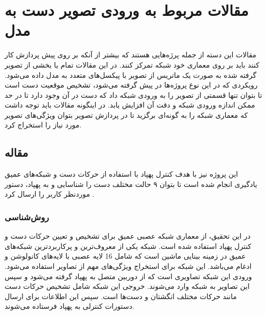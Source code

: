 



\section{مقالات مربوط به ورودی تصویر دست به مدل}
مقالات این دسته از جمله پرژه‌هایی هستند که بیشتر از آنکه بر روی پیش پردازش کار کنند باید بر روی معماری خود شبکه تمرکز کنند. در این مقالات تمام یا بخشی از تصویر گرفته شده به صورت یک ماتریس از تصویر با پیکسل‌های متعدد به مدل داده می‌شود. رویکردی که در این نوع پروژه‌ها در پیش گرفته می‌شود، تشخیص موقعیت دست است تا بتوان تنها قسمتی از تصویر را به ورودی شبکه داد که دست در آن وجود دارد تا در حد ممکن
 اندازه ورودی شبکه و دقت آن افزایش یابد. در اینگونه مقالات باید توجه داشت که معماری شبکه را به گونه‌ای برگزید تا در پردازش تصویر بتوان ویژگی‌های تصویر مورد نیاز را استخراج کرد.


\subsection{مقاله }
این پروژه نیز با هدف کنترل پهپاد با استفاده از حرکات دست و شبکه‌های عمیق یادگیری انجام شده است تا بتوان ۹ حالت مختلف دست را شناسایی و به پهپاد، دستور موردنظر کاربر را ارسال کرد \cite{hadri2018hand}.

\subsubsection{روش‌شناسی}
در این تحقیق، از معماری شبکه عصبی عمیق  برای تشخیص و تعیین حرکات دست و کنترل پهپاد استفاده شده است. شبکه  یکی از معروف‌ترین و پرکاربردترین شبکه‌های عمیق در زمینه بینایی ماشین است که 
شامل 16 لایه عصبی با لایه‌های کانولوشن و ادغام  می‌باشد. این شبکه برای استخراج ویژگی‌های مهم از تصاویر استفاده می‌شود. ورودی این شبکه تصاویری است که از دوربین متصل به پهپاد گرفته می‌شود و سپس این 
تصاویر به شبکه وارد می‌شوند. خروجی این شبکه شامل تشخیص حرکات دست مانند حرکات مختلف انگشتان و دست‌ها است. سپس این اطلاعات برای ارسال دستورات کنترلی به پهپاد فرستاده می‌شوند. 

